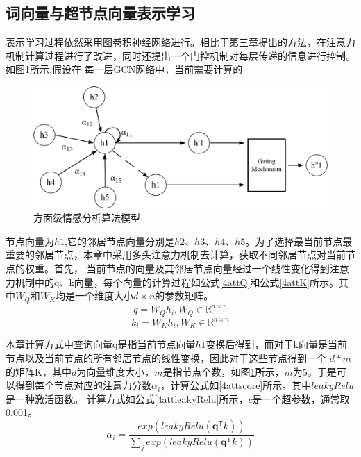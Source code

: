 \subsection{词向量与超节点向量表示学习}
表示学习过程依然采用图卷积神经网络进行。相比于第三章提出的方法，在注意力机制计算过程进行了改进，同时还提出一个门控机制对每层传递的信息进行控制。如图\ref{attgcn}所示,假设在
每一层GCN网络中，当前需要计算的
\begin{figure}[htb]
	\setlength{\belowcaptionskip}{0pt}
	\centering
	\includegraphics[width=1\textwidth]{pic/attgcn.png}
	\caption{方面级情感分析算法模型}
	\label{attgcn}
\end{figure}
节点向量为$h1$,它的邻居节点向量分别是$h2$、$h3$、$h4$、$h5$。为了选择最当前节点最重要的邻居节点，本章中采用多头注意力机制去计算，获取不同邻居节点对当前节点的权重。首先，
当前节点的向量及其邻居节点向量经过一个线性变化得到注意力机制中的q、k向量，每个向量的计算过程如公式\ref{4attQ}和公式\ref{4attK}所示。其中$W_Q$和$W_K$均是一个维度大小$d\times n$的参数矩阵。
\begin{equation}\label{4attQ}
    q = W_Qh_i, W_Q\in \mathbb{R}^{d\times n}
\end{equation}
\begin{equation}\label{4attK}
    k_i = W_Kh_i, W_K\in \mathbb{R}^{d\times n}
\end{equation}

本章计算方式中查询向量q是指当前节点向量$h1$变换后得到，而对于k向量是当前节点以及当前节点的所有邻居节点的线性变换，因此对于这些节点得到一个
$d*m$的矩阵K，其中$d$为向量维度大小，$m$是指节点个数，如图\ref{attgcn}所示，$m$为5。于是可以得到每个节点对应的注意力分数$\alpha_i$，计算公式如\ref{4attscore}所示。其中$leakyRelu$是一种激活函数。
计算方式如公式\ref{4attleakyRelu}所示，$c$是一个超参数，通常取0.001。
\begin{equation}\label{4attscore}
    \alpha_i = \frac{exp(leakyRelu(\mathbf{q}^\mathsf{T}k))}{\sum_{j}exp(leakyRelu(\mathbf{q}^\mathsf{T}k))}
\end{equation}

